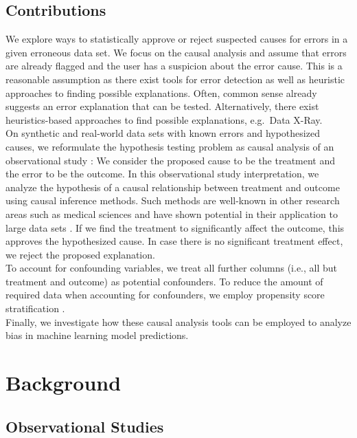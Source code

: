 \documentclass[acmsmall, nonacm, screen]{acmart} %
\begin{document}
\subsection{Contributions}
We explore ways to statistically approve or reject suspected causes for errors in a given erroneous data set.
We focus on the causal analysis and assume that errors are already flagged and the user has a suspicion about the error cause. 
This is a reasonable assumption as there exist tools for error detection as well as heuristic approaches to finding possible explanations. Often, common sense already suggests an error explanation that can be tested. Alternatively, there exist heuristics-based approaches to find possible explanations, e.g.\ Data X-Ray.\\

On synthetic and real-world data sets with known errors and hypothesized causes, we reformulate the hypothesis testing problem as causal analysis of an observational study \cite{Rosenbaum02}: We consider the proposed cause to be the treatment and the error to be the outcome.
In this observational study interpretation, we analyze the hypothesis of a causal relationship between treatment and outcome using causal inference methods. 
Such methods are well-known in other research areas such as medical sciences and have shown potential in their application to large data sets \cite{Robins16}.
If we find the treatment to significantly affect the outcome, this approves the hypothesized cause. In case there is no significant treatment effect, we reject the proposed explanation.\\

To account for confounding variables, we treat all further columns (i.e., all but treatment and outcome) as potential confounders. To reduce the amount of required data when accounting for confounders, we employ propensity score stratification \cite{Austin11}.\\

Finally, we investigate how these causal analysis tools can be employed to analyze bias in machine learning model predictions.\\


\section{Background}

\subsection{Observational Studies}
\end{document}
